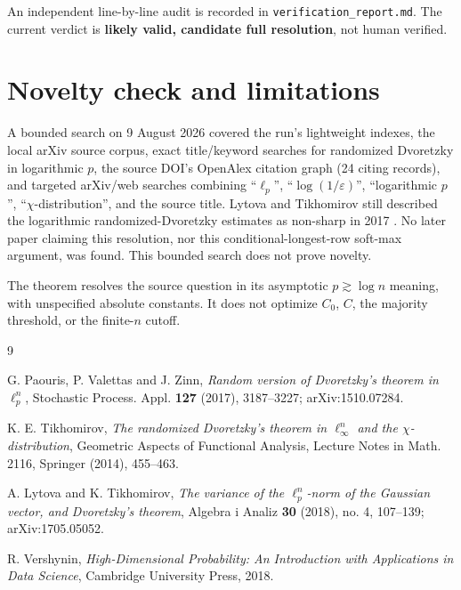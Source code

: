 \documentclass[11pt]{article}
\newcommand{\eps}{\varepsilon}
\begin{document}
An independent line-by-line audit is recorded in
\texttt{verification\_report.md}.  The current verdict is
\textbf{likely valid, candidate full resolution}, not human verified.

\section{Novelty check and limitations}

A bounded search on 9 August 2026 covered the run's lightweight indexes, the
local arXiv source corpus, exact title/keyword searches for randomized
Dvoretzky in logarithmic $p$, the source DOI's OpenAlex citation graph
(24 citing records), and targeted arXiv/web searches combining
``$\ell_p$'', ``$\log(1/\eps)$'', ``logarithmic $p$'', ``$\chi$-distribution'',
and the source title.  Lytova and Tikhomirov still described the logarithmic
randomized-Dvoretzky estimates as non-sharp in 2017 \cite{LT18}.  No later
paper claiming this resolution, nor this conditional-longest-row soft-max
argument, was found.  This bounded search does not prove novelty.

The theorem resolves the source question in its asymptotic
$p\gtrsim\log n$ meaning, with unspecified absolute constants.  It does not
optimize $C_0$, $C$, the majority threshold, or the finite-$n$ cutoff.

\begin{thebibliography}{9}

G. Paouris, P. Valettas and J. Zinn,
\emph{Random version of Dvoretzky's theorem in $\ell_p^n$},
Stochastic Process. Appl. \textbf{127} (2017), 3187--3227;
arXiv:1510.07284.

K. E. Tikhomirov,
\emph{The randomized Dvoretzky's theorem in $\ell_\infty^n$ and the
$\chi$-distribution},
Geometric Aspects of Functional Analysis, Lecture Notes in Math. 2116,
Springer (2014), 455--463.

A. Lytova and K. Tikhomirov,
\emph{The variance of the $\ell_p^n$-norm of the Gaussian vector, and
Dvoretzky's theorem},
Algebra i Analiz \textbf{30} (2018), no. 4, 107--139;
arXiv:1705.05052.

R. Vershynin,
\emph{High-Dimensional Probability: An Introduction with Applications in
Data Science}, Cambridge University Press, 2018.

\end{thebibliography}
\end{document}

